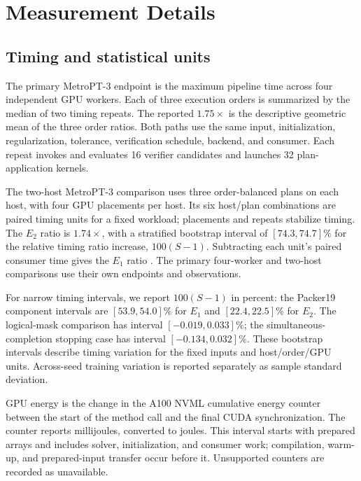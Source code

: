\section{Measurement Details}
\label{sec:measurement-details}

\subsection{Timing and statistical units}
\label{sec:timing-uncertainty}

The primary MetroPT-3 endpoint is the maximum pipeline time across four independent GPU workers. Each of three execution orders is summarized by the median of two timing repeats. The reported $1.75\times$ is the descriptive geometric mean of the three order ratios. Both paths use the same input, initialization, regularization, tolerance, verification schedule, backend, and consumer. Each repeat invokes and evaluates 16 verifier candidates and launches 32 plan-application kernels.

The two-host MetroPT-3 comparison uses three order-balanced plans on each host, with four GPU placements per host. Its six host/plan combinations are paired timing units for a fixed workload; placements and repeats stabilize timing. The $E_2$ ratio is $1.74\times$, with a stratified bootstrap interval of $[74.3,74.7]\%$ for the relative timing ratio increase, $100(S-1)$. Subtracting each unit's paired consumer time gives the $E_1$ ratio \CMetroRetirementOTSpeedup{}. The primary four-worker and two-host comparisons use their own endpoints and observations.

For narrow timing intervals, we report $100(S-1)$ in percent: the Packer19 component intervals are $[53.9,54.0]\%$ for $E_1$ and $[22.4,22.5]\%$ for $E_2$. The logical-mask comparison has interval $[-0.019,0.033]\%$; the simultaneous-completion stopping case has interval $[-0.134,0.032]\%$. These bootstrap intervals describe timing variation for the fixed inputs and host/order/GPU units. Across-seed training variation is reported separately as sample standard deviation.

GPU energy is the change in the A100 NVML cumulative energy counter between the start of the method call and the final CUDA synchronization. The counter reports millijoules, converted to joules. This interval starts with prepared arrays and includes solver, initialization, and consumer work; compilation, warm-up, and prepared-input transfer occur before it. Unsupported counters are recorded as unavailable.

